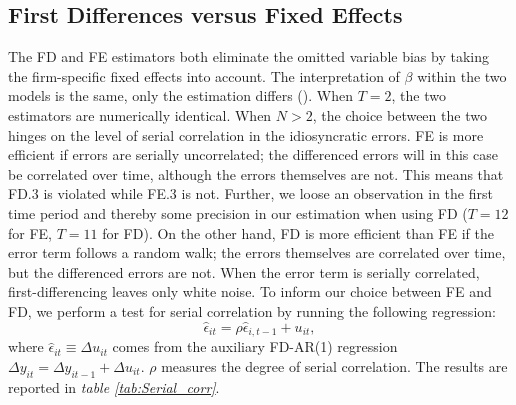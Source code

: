 \documentclass[11pt]{article}
\begin{document}
\subsection{First Differences versus Fixed Effects}
The FD and FE estimators both eliminate the omitted variable bias by taking the firm-specific fixed effects into account. The interpretation of $\beta$ within the two models is the same, only the estimation differs (\cite{Wooldrige_2010_10}). When $T=2$, the two estimators are numerically identical. When $N>2$, the choice between the two hinges on the level of serial correlation in the idiosyncratic errors. FE is more efficient if errors are serially uncorrelated; the differenced errors will in this case be correlated over time, although the errors themselves are not. This means that FD.3 is violated while FE.3 is not. Further, we loose an observation in the first time period and thereby some precision in our estimation when using FD ($T=12$ for FE, $T=11$ for FD). 
On the other hand, FD is more efficient than FE if the error term follows a random walk; the errors themselves are correlated over time, but the differenced errors are not. When the error term is serially correlated, first-differencing leaves only white noise.
To inform our choice between FE and FD, we perform a test for serial correlation by running the following regression:
\begin{equation}
    \widehat{\epsilon}_{it}= \rho\widehat{\epsilon}_{i,t-1}+u_{it},
\end{equation}
where $\widehat{\epsilon}_{it}\equiv \Delta u_{it}$ comes from the auxiliary FD-AR(1) regression $\Delta y_{it} = \Delta y_{it-1} + \Delta u_{it}$. $\rho$ measures the degree of serial correlation. 
The results are reported in \textit{table \ref{tab:Serial_corr}}.
\end{document}
